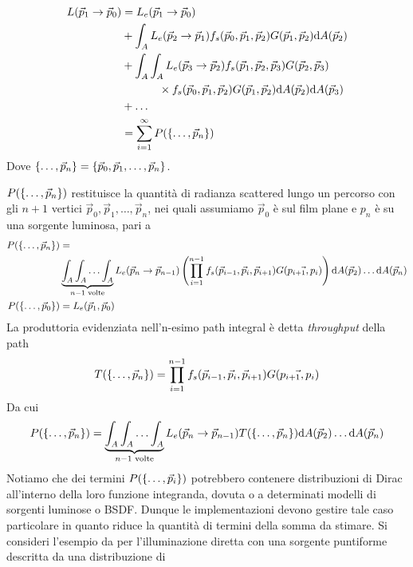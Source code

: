 \begin{align}
	L(\vec{p}_1\to\vec{p}_0)&=L_e(\vec{p}_1\to\vec{p}_0) \nonumber \\
		&+\int_{A}L_e(\vec{p}_2\to\vec{p}_1)f_s(\vec{p}_0,\vec{p}_1,\vec{p}_2)G(\vec{p}_1,\vec{p}_2)\mathrm{d}A(\vec{p}_2) \nonumber \\
		&+\int_{A}\int_{A}L_e(\vec{p}_3\to\vec{p}_2)f_s(\vec{p}_1,\vec{p}_2,\vec{p}_3)G(\vec{p}_2,\vec{p}_3) \nonumber \\
		&\;\;\;\;\;\;\;\;\;\;\;\;\times f_s(\vec{p}_0,\vec{p}_1,\vec{p}_2)G(\vec{p}_1,\vec{p}_2)\mathrm{d}A(\vec{p}_2)\mathrm{d}A(\vec{p}_3) \nonumber\\
		&+\ldots \nonumber \\
		&=\sum_{i=1}^\infty P(\{\ldots,\vec{p}_{n}\})
\end{align}
Dove $\{\ldots,\vec{p}_{n}\}=\{\vec{p}_0,\vec{p}_1,\ldots,\vec{p}_n\}$.\par
$P(\{\ldots,\vec{p}_{n}\})$ restituisce la quantit\`a di radianza scattered lungo un percorso con 
gli $n+1$ vertici $\vec{p}_0,\vec{p}_1,\ldots,\vec{p}_n$, nei quali assumiamo $\vec{p}_0$ \`e sul film plane e $p_n$ \`e su una sorgente luminosa, 
pari a 
\begin{align}
	P(\ptset{n}) &= \nonumber\\&\underbrace{\int_A\int_A\ldots\int_A}_{n-1\text{ volte}}L_e(\vec{p}_n\to\vec{p}_{n-1})\left(\prod_{i=1}^{n-1}%
		f_s(\vec{p}_{i-1},\vec{p}_i,\vec{p}_{i+1})G(\vec{p_{i+1},p_{i}})\right)\mathrm{d}A(\vec{p}_2)\ldots\mathrm{d}A(\vec{p}_n) \\
	P(\ptset{0}) &= L_e(\vec{p}_1,\vec{p}_0) \nonumber
\end{align}
La produttoria evidenziata nell'n-esimo path integral \`e detta \textit{throughput} della path
\begin{equation}
	T(\{\ldots,\vec{p}_{n}\})=\prod_{i=1}^{n-1}f_s(\vec{p}_{i-1},\vec{p}_i,\vec{p}_{i+1})G(\vec{p_{i+1},p_{i}})
\end{equation}
Da cui 
\begin{equation}
	P(\ptset{n}) = \underbrace{\int_A\int_A\ldots\int_A}_{n-1\text{ volte}}L_e(\vec{p}_n\to\vec{p}_{n-1})T(\ptset{n})%
		\mathrm{d}A(\vec{p}_2)\ldots\mathrm{d}A(\vec{p}_n)
\end{equation}
Notiamo che dei termini $P(\{\ldots,\vec{p}_{i}\})$ potrebbero contenere distribuzioni di Dirac all'interno della loro funzione integranda, dovuta o a determinati 
modelli di sorgenti luminose o BSDF. Dunque le implementazioni devono gestire tale caso particolare in quanto riduce la quantit\`a di termini della 
somma da stimare. Si consideri l'esempio da \cite{pharr} per l'illuminazione diretta con una sorgente puntiforme descritta da una distribuzione di 
